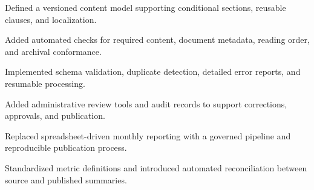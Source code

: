 \documentclass[fontsize=11pt, margin=narrow, medium=print]{careerdossier-resume}
\begin{document}
\begin{CDossierEntry}[title = {Accessible Public Correspondence Platform}, dates = {2025--2026}]
  \begin{CDossierItemize}
    \item Defined a versioned content model supporting conditional sections, reusable clauses, and localization.
    \item Added automated checks for required content, document metadata, reading order, and archival conformance.
  \end{CDossierItemize}
\end{CDossierEntry}
\begin{CDossierEntry}[title = {Open Data Submission Gateway}, dates = {2024--2025}]
  \begin{CDossierItemize}
    \item Implemented schema validation, duplicate detection, detailed error reports, and resumable processing.
    \item Added administrative review tools and audit records to support corrections, approvals, and publication.
  \end{CDossierItemize}
\end{CDossierEntry}
\begin{CDossierEntry}[title = {Operational Reporting Modernization}, dates = {2023--2024}]
  \begin{CDossierItemize}
    \item Replaced spreadsheet-driven monthly reporting with a governed pipeline and reproducible publication process.
    \item Standardized metric definitions and introduced automated reconciliation between source and published summaries.
  \end{CDossierItemize}
\end{CDossierEntry}

\begin{CDossierEntry}[title = {Ph.D. in Computer Science}, organization = {University of Toronto}, location = {Toronto, ON}, dates = {2021--2026}]
\end{CDossierEntry}
\begin{CDossierEntry}[title = {M.Sc. in Software Engineering}, organization = {McGill University}, location = {Montréal, QC}, dates = {2019--2021}]
\end{CDossierEntry}
\begin{CDossierEntry}[title = {B.A.Sc. in Computer Engineering, Honours}, organization = {University of Waterloo}, location = {Waterloo, ON}, dates = {2014--2019}]
\end{CDossierEntry}

\begin{CDossierEntry}[title = {Professional Certificate in Accessible Document Production}, organization = {Standards and Accessibility Institute}, dates = {2026}]
\end{CDossierEntry}
\begin{CDossierEntry}[title = {Cloud Architecture and Reliability Engineering}, organization = {Canadian Technology Learning Consortium}, dates = {2025}]
\end{CDossierEntry}
\end{document}
